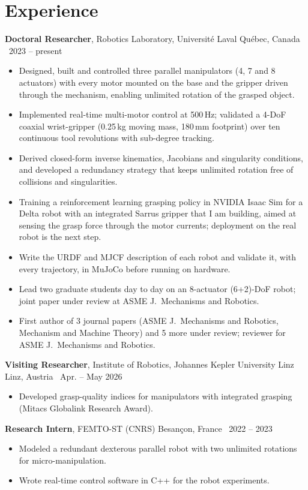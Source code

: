 \documentclass[10pt,letterpaper]{article}
\newcommand{\role}[4]{\textbf{#1}, #2 \hfill {\color{muted}#3 \textbar\ #4}\par}
\begin{document}
\section{Experience}
\role{Doctoral Researcher}{Robotics Laboratory, Universit\'e Laval}{Qu\'ebec, Canada}{2023 -- present}
\begin{itemize}
\item Designed, built and controlled three parallel manipulators (4, 7 and 8 actuators) with every motor
mounted on the base and the gripper driven through the mechanism, enabling unlimited rotation of the grasped object.
\item Implemented real-time multi-motor control at 500\,Hz; validated a 4-DoF coaxial wrist-gripper (0.25\,kg moving mass,
180\,mm footprint) over ten continuous tool revolutions with sub-degree tracking.
\item Derived closed-form inverse kinematics, Jacobians and singularity conditions, and developed a redundancy
strategy that keeps unlimited rotation free of collisions and singularities.
\item Training a reinforcement learning grasping policy in NVIDIA Isaac Sim for a Delta robot with an integrated Sarrus
gripper that I am building, aimed at sensing the grasp force through the motor currents; deployment on the real robot is
the next step.
\item Write the URDF and MJCF description of each robot and validate it, with every trajectory, in MuJoCo before running on hardware.
\item Lead two graduate students day to day on an 8-actuator (6+2)-DoF robot; joint paper under review at ASME J.\
Mechanisms and Robotics.
\item First author of 3 journal papers (ASME J.\ Mechanisms and Robotics, Mechanism and Machine Theory) and 5 more
under review; reviewer for ASME J.\ Mechanisms and Robotics.
\end{itemize}

\vspace{3pt}
\role{Visiting Researcher}{Institute of Robotics, Johannes Kepler University Linz}{Linz, Austria}{Apr. -- May 2026}
\begin{itemize}
\item Developed grasp-quality indices for manipulators with integrated grasping (Mitacs Globalink Research Award).
\end{itemize}

\vspace{3pt}
\role{Research Intern}{FEMTO-ST (CNRS)}{Besan\c{c}on, France}{2022 -- 2023}
\begin{itemize}
\item Modeled a redundant dexterous parallel robot with two unlimited rotations for micro-manipulation.
\item Wrote real-time control software in C++ for the robot experiments.
\end{itemize}
\end{document}
